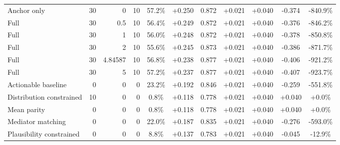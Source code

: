 \begin{table}[htbp]
\begin{tabular}{lrrrccccccc}
Anchor only & 30 & 0 & 10 & 57.2\% & +0.250 & 0.872 & +0.021 & +0.040 & -0.374 & -840.9\% \\
Full & 30 & 0.5 & 10 & 56.4\% & +0.249 & 0.872 & +0.021 & +0.040 & -0.376 & -846.2\% \\
Full & 30 & 1 & 10 & 56.0\% & +0.248 & 0.872 & +0.021 & +0.040 & -0.378 & -850.8\% \\
Full & 30 & 2 & 10 & 55.6\% & +0.245 & 0.873 & +0.021 & +0.040 & -0.386 & -871.7\% \\
Full & 30 & 4.84587 & 10 & 56.8\% & +0.238 & 0.877 & +0.021 & +0.040 & -0.406 & -921.2\% \\
Full & 30 & 5 & 10 & 57.2\% & +0.237 & 0.877 & +0.021 & +0.040 & -0.407 & -923.7\% \\
Actionable baseline & 0 & 0 & 0 & 23.2\% & +0.192 & 0.846 & +0.021 & +0.040 & -0.259 & -551.8\% \\
Distribution constrained & 10 & 0 & 0 & 0.8\% & +0.118 & 0.778 & +0.021 & +0.040 & +0.040 & +0.0\% \\
Mean parity & 0 & 0 & 0 & 0.8\% & +0.118 & 0.778 & +0.021 & +0.040 & +0.040 & +0.0\% \\
Mediator matching & 0 & 0 & 0 & 22.0\% & +0.187 & 0.835 & +0.021 & +0.040 & -0.276 & -593.0\% \\
Plausibility constrained & 0 & 0 & 0 & 8.8\% & +0.137 & 0.783 & +0.021 & +0.040 & -0.045 & -12.9\% \\
\bottomrule
\end{tabular}
\end{table}